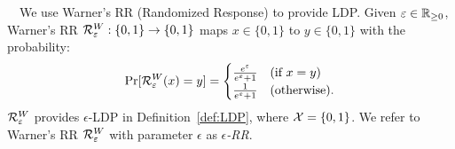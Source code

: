 
\smallskip
{}~~We use Warner's RR (Randomized Response) \cite{Warner_JASA65} to provide 
LDP. 
Given $\varepsilon \in \mathbb{R}_{\ge0}$, Warner's RR $\mathcal{R}_{\varepsilon}^W: \{0,1\} \rightarrow \{0,1\}$ maps $x \in \{0,1\}$ to $y \in \{0,1\}$ with the probability: 
\begin{align*}
    \Pr[\mathcal{R}_{\varepsilon}^W(x) = y] = 
    \begin{cases}
    \frac{e^\varepsilon}{e^\varepsilon + 1}   &   \text{(if $x=y$)} \\
    \frac{1}{e^\varepsilon + 1}   &   \text{(otherwise)}.
    \end{cases}
\end{align*}
$\mathcal{R}_{\varepsilon}^W$ 
provides $\epsilon$-LDP in Definition~\ref{def:LDP}, where $\mathcal{X} = \{0,1\}$. 
We refer to Warner's RR $\mathcal{R}_{\varepsilon}^W$ with parameter $\epsilon$ as \textit{$\epsilon$-RR}. 

